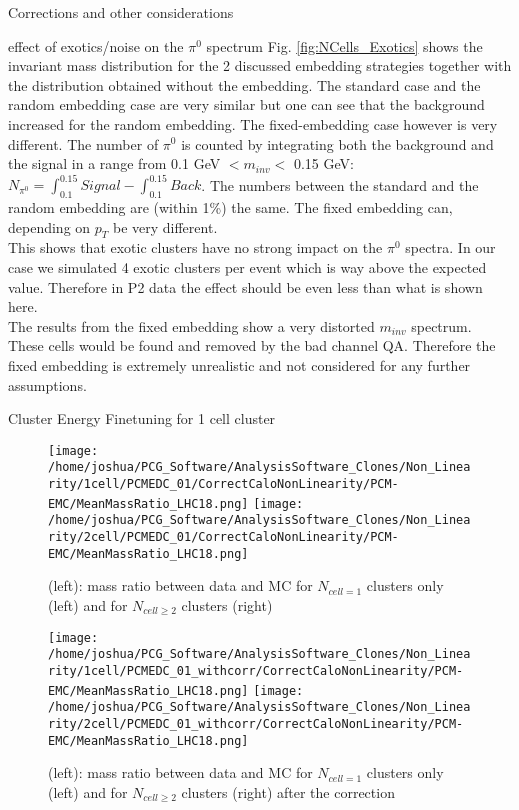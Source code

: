 \documentclass[ALICE]{ALICE_analysis_notes}
\begin{document}
\begin{section}{Corrections and other considerations}
\begin{subsection}{effect of exotics/noise on the $\pi^{0}$ spectrum}
Fig. \ref{fig:NCells_Exotics} shows the invariant mass distribution for the 2 discussed embedding strategies together with the distribution obtained without the embedding. The standard case and the random embedding case are very similar but one can see that the background increased for the random embedding. The fixed-embedding case however is very different. The number of $\pi^{0}$ is counted by integrating both the background and the signal in a range from 0.1 GeV $< m_{inv} <$ 0.15 GeV: $N_{\pi^{0}} = \int_{0.1}^{0.15} Signal -\int_{0.1}^{0.15} Back$. The numbers between the standard and the random embedding are (within 1\%) the same. The fixed embedding can, depending on $p_{T}$ be very different.\\
This shows that exotic clusters have no strong impact on the $\pi^{0}$ spectra. In our case we simulated 4 exotic clusters per event which is way above the expected value. Therefore in P2 data the effect should be even less than what is shown here.\\
The results from the fixed embedding show a very distorted $m_{inv}$ spectrum. These cells would be found and removed by the bad channel QA. Therefore the fixed embedding is extremely unrealistic and not considered for any further assumptions. 

\end{subsection}

\begin{subsection}{Cluster Energy Finetuning for 1 cell cluster}
	\label{sec:nonlin}
\begin{figure}[ht!]
	\centering
	\texttt{[image: /home/joshua/PCG\_Software/AnalysisSoftware\_Clones/Non\_Linearity/1cell/PCMEDC\_01/CorrectCaloNonLinearity/PCM-EMC/MeanMassRatio\_LHC18.png]}
	\texttt{[image: /home/joshua/PCG\_Software/AnalysisSoftware\_Clones/Non\_Linearity/2cell/PCMEDC\_01/CorrectCaloNonLinearity/PCM-EMC/MeanMassRatio\_LHC18.png]}
	\caption{ (left): mass ratio between data and MC for $N_{cell = 1}$ clusters only (left) and for $N_{cell \geq 2}$ clusters (right) }
	\label{fig:NonLin}
\end{figure}


\begin{figure}[ht!]
	\centering
	\texttt{[image: /home/joshua/PCG\_Software/AnalysisSoftware\_Clones/Non\_Linearity/1cell/PCMEDC\_01\_withcorr/CorrectCaloNonLinearity/PCM-EMC/MeanMassRatio\_LHC18.png]}
	\texttt{[image: /home/joshua/PCG\_Software/AnalysisSoftware\_Clones/Non\_Linearity/2cell/PCMEDC\_01\_withcorr/CorrectCaloNonLinearity/PCM-EMC/MeanMassRatio\_LHC18.png]}
	\caption{ (left): mass ratio between data and MC for $N_{cell = 1}$ clusters only (left) and for $N_{cell \geq 2}$ clusters (right) after the correction }
	\label{fig:NonLin2}
\end{figure}




\end{subsection}
\end{section}
\end{document}
